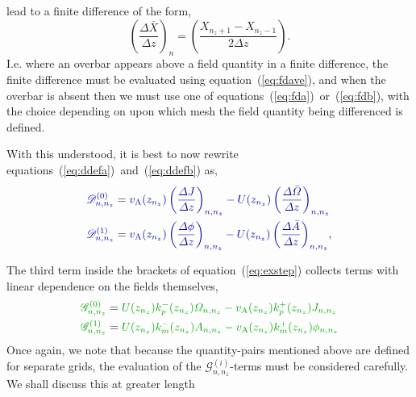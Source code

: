 \documentclass[12pt]{memoir}
\newcommand{\dfield}{\mathscr{D}}
\newcommand{\gfield}{\mathscr{G}}
\begin{document}
lead to a finite difference of the form,
%
\begin{equation}
  \left(\frac{\Delta \bar X}{\Delta z}\right)_n = \left(\frac{X_{n_z + 1} - X_{n_z-1}}{2\Delta z}\right).
  \label{eq:fdave}
\end{equation}
%
I.e. where an overbar appears above a field quantity in a finite
difference, the finite difference must be evaluated using
equation~(\ref{eq:fdave}), and when the overbar is absent then
we must use one of equations~(\ref{eq:fda})~or~(\ref{eq:fdb}),
with the choice depending on upon which mesh the field quantity
being differenced is defined.
%
\par
%
With this understood, it is best to now rewrite
equations~(\ref{eq:ddefa})~and~(\ref{eq:ddefb}) as,
%
\begin{subequations}
\begin{align}
%
  {\color{blue!65!black}\dfield^{(0)}_{n,n_z}} &= 
%
  {\color{blue!65!black}
     \magvalfven(z_{n_z})\left(\frac{\Delta  J}{\Delta z}\right)_{n,n_z} 
    - U(z_{n_z})\left(\frac{\Delta \bar\Omega}{\Delta z}\right)_{n,n_z}
  } \label{eq:ddefa} \\
%
  {\color{blue!65!black}\dfield^{(1)}_{n,n_z}} &= 
%
  {\color{blue!65!black}
    \magvalfven(z_{n_z})\left(\frac{\Delta \phi}{\Delta z}\right)_{n,n_z}
   - U(z_{n_z})\left(\frac{\Delta \bar A}{\Delta z}\right)_{n,n_z}
  },\label{eq:ddefb}
%
\end{align}
\end{subequations}
%
\par
%
The third term inside the brackets of equation~(\ref{eq:exstep}) collects 
terms with linear dependence on the fields themselves,
%
\begin{subequations}
\begin{align}
%
  { \color{green!65!black}\gfield^{(0)}_{n,n_z}} &= 
%
  {\color{green!65!black}
    U(z_{n_z})\kpm(z_{n_z})\Omega_{n,n_z} - \magvalfven(z_{n_z})\kpp(z_{n_{z}}) J_{n,n_z}   
  } 
  \label{eq:ldefa} \\
%
  {\color{green!65!black}\gfield^{(1)}_{n,n_z}} &= 
%
  {\color{green!65!black}
    U(z_{n_z})\kmm(z_{n_z}) A_{n,n_z}     - \magvalfven(z_{n_z})\kmp(z_{n_z})  \phi_{n,n_z} 
  } 
   \label{eq:ldefb}
%
\end{align}
\end{subequations}
%
Once again, we note that because the quantity-pairs mentioned above are
defined for separate grids, the evaluation of the 
{\color{green!65!black}$\gfield^{(i)}_{n,n_z}$}-terms 
must be considered carefully. We shall discuss this at greater length 
\end{document}
